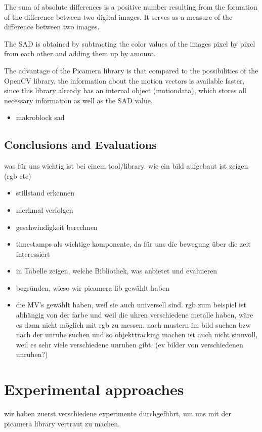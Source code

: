 \documentclass[12pt, a4paper]{report}
\begin{document}
    The sum of absolute differences is a positive number resulting from the formation of the difference between two digital images. It serves as a measure of the difference between two images.
    
    The SAD is obtained by subtracting the color values of the images pixel by pixel from each other and adding them up by amount. 
    
    The advantage of the Picamera library is that compared to the possibilities of the OpenCV library, the information about the motion vectors is available faster, since this library already has an internal object (motiondata), which stores all necessary information as well as the SAD value. 
     \begin{itemize}
        \item makroblock sad
        \end{itemize}
    
   
   \section{Conclusions and Evaluations}
       was für uns wichtig ist bei einem tool/library. wie ein bild aufgebaut ist zeigen (rgb etc)
    \begin{itemize}
        \item stillstand erkennen
        \item merkmal verfolgen
        \item geschwindigkeit berechnen
        \item timestamps als wichtige komponente, da für uns die bewegung über die zeit interessiert
        \item in Tabelle zeigen, welche Bibliothek, was anbietet und evaluieren
        \item begründen, wieso wir picamera lib gewählt haben
        \item die MV's gewählt haben, weil sie auch universell sind. rgb zum beispiel ist abhängig
        von der farbe und weil die uhren verschiedene metalle haben, wäre es dann nicht möglich mit rgb zu messen. nach mustern im bild suchen bzw nach der unruhe suchen
        und so objekttracking machen ist auch nicht sinnvoll, weil es sehr viele verschiedene unruhen gibt. (ev bilder von verschiedenen unruhen?)
    \end{itemize}
    

    \chapter {Experimental approaches}
    wir haben zuerst verschiedene experimente durchgeführt, um uns mit der picamera library vertraut zu machen. 
\end{document}
